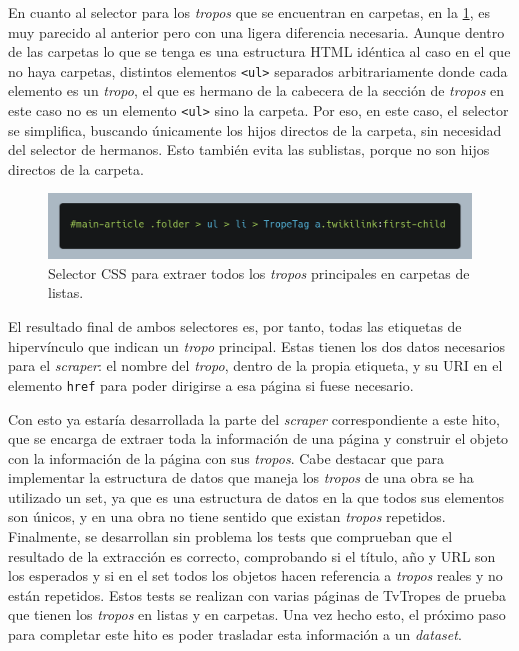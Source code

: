 En cuanto al selector para los \textit{tropos} que se encuentran en carpetas, en
la \ref{fig:selector-folder}, es muy parecido al anterior pero con una ligera
diferencia necesaria. Aunque dentro de las carpetas lo que se tenga es una
estructura HTML idéntica al caso en el que no haya carpetas, distintos elementos \texttt{<ul>} separados 
arbitrariamente donde cada elemento es un \textit{tropo}, el que es hermano de
la cabecera de la sección de \textit{tropos} en este caso no es un elemento \texttt{<ul>} sino 
la carpeta. Por eso, en este caso, el selector se simplifica,
buscando únicamente los hijos directos de la carpeta, sin necesidad del selector
de hermanos. Esto también evita las sublistas, porque no son hijos directos de
la carpeta.

\begin{figure}[ht]
    \includegraphics[width=\textwidth]{img/selector-tropes-folders.png}
    \caption{Selector CSS para extraer todos los \textit{tropos} principales en
    carpetas de listas.}
    \label{fig:selector-folder}
\end{figure}

El resultado final de ambos selectores es, por tanto, todas las etiquetas de
hipervínculo que indican un \textit{tropo} principal. Estas tienen los dos datos
necesarios para el \textit{scraper}: el nombre del \textit{tropo}, dentro de la
propia etiqueta, y su URI en el elemento \texttt{href} para poder dirigirse a
esa página si fuese necesario.

Con esto ya estaría desarrollada la parte del \textit{scraper} correspondiente a
este hito, que se encarga de extraer toda la información de una página y
construir el objeto con la información de la página con sus \textit{tropos}.
Cabe destacar que para implementar la estructura de datos que maneja los
\textit{tropos} de una obra se ha utilizado un set, ya que es una estructura de
datos en la que todos sus elementos son únicos, y en una obra no tiene sentido
que existan \textit{tropos} repetidos. Finalmente, se desarrollan sin problema
los tests que comprueban que el resultado de la extracción es correcto,
comprobando si el título, año y URL son los esperados y si en el set todos los
objetos hacen referencia a \textit{tropos} reales y no están repetidos. Estos
tests se realizan con varias páginas de TvTropes de prueba que tienen los
\textit{tropos} en listas y en carpetas. Una vez hecho esto, el próximo paso
para completar este hito es poder trasladar esta información a un
\textit{dataset}.

